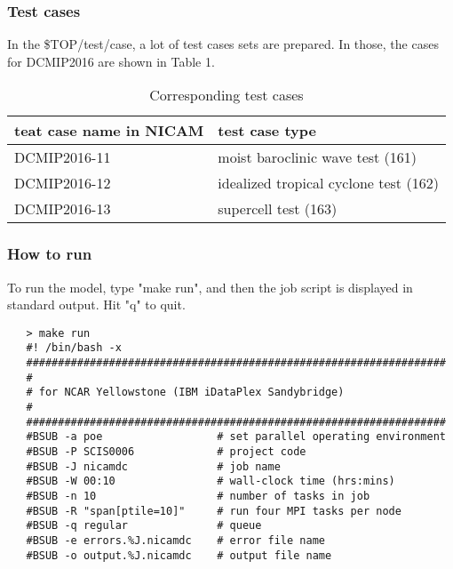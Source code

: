 \subsubsection{Test cases}

\noindent In the \${TOP}/test/case, a lot of test cases sets are prepared.
In those, the cases for DCMIP2016 are shown in Table 1.

 \begin{table}[b]
 \begin{center}
 \caption{Corresponding test cases}
 \begin{tabularx}{150mm}{|l|X|} \hline
 \rowcolor[gray]{0.9} teat case name in NICAM & test case type \\ \hline
  DCMIP2016-11 & moist baroclinic wave test (161)       \\ \hline
  DCMIP2016-12 & idealized tropical cyclone test (162)  \\ \hline
  DCMIP2016-13 & supercell test (163)                   \\ \hline
 \end{tabularx}
 \end{center}
 \end{table}


\subsubsection{How to run}

To run the model, type "make run", and then the job script is
displayed in standard output. Hit "q" to quit.

 \begin{verbatim}
   > make run
   #! /bin/bash -x
   ##################################################################
   #
   # for NCAR Yellowstone (IBM iDataPlex Sandybridge)
   #
   ##################################################################
   #BSUB -a poe                  # set parallel operating environment
   #BSUB -P SCIS0006             # project code
   #BSUB -J nicamdc              # job name
   #BSUB -W 00:10                # wall-clock time (hrs:mins)
   #BSUB -n 10                   # number of tasks in job
   #BSUB -R "span[ptile=10]"     # run four MPI tasks per node
   #BSUB -q regular              # queue
   #BSUB -e errors.%J.nicamdc    # error file name
   #BSUB -o output.%J.nicamdc    # output file name
 \end{verbatim}

